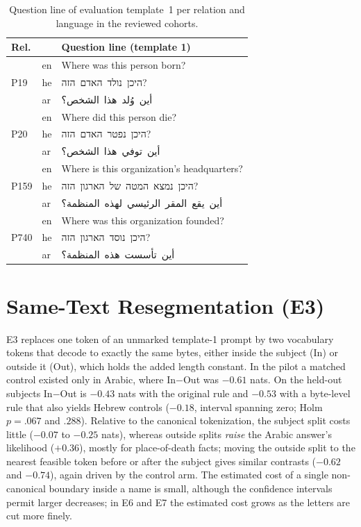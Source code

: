 \documentclass[11pt]{article}
\newcommand{\he}[1]{\mbox{\beginR\hebfont #1\endR}}
\newcommand{\ar}[1]{\mbox{\beginR\arabfont #1\endR}}
\begin{document}
\begin{table}[!ht]
\centering\small
\setlength{\tabcolsep}{4pt}
\renewcommand{\arraystretch}{1.15}
\begin{tabular}{@{}lll@{}}
\toprule
Rel. & & Question line (template 1)\\
\midrule
\multirow{3}{*}{P19} & en & Where was this person born?\\
 & he & \he{היכן נולד האדם הזה?}\\
 & ar & \ar{أين وُلد هذا الشخص؟}\\
\midrule
\multirow{3}{*}{P20} & en & Where did this person die?\\
 & he & \he{היכן נפטר האדם הזה?}\\
 & ar & \ar{أين توفي هذا الشخص؟}\\
\midrule
\multirow{3}{*}{P159} & en & Where is this organization's headquarters?\\
 & he & \he{היכן נמצא המטה של הארגון הזה?}\\
 & ar & \ar{أين يقع المقر الرئيسي لهذه المنظمة؟}\\
\midrule
\multirow{3}{*}{P740} & en & Where was this organization founded?\\
 & he & \he{היכן נוסד הארגון הזה?}\\
 & ar & \ar{أين تأسست هذه المنظمة؟}\\
\bottomrule
\end{tabular}
\caption{Question line of evaluation template~1 per relation and language in the
reviewed cohorts.}
\label{tab:templates}
\end{table}

\section{Same-Text Resegmentation (E3)}
\label{app:e3}
E3 replaces one token of an unmarked template-1 prompt by two vocabulary tokens
that decode to exactly the same bytes, either inside the subject (In) or outside
it (Out), which holds the added length constant. In the pilot a matched control
existed only in Arabic, where In$-$Out was $-0.61$ nats. On the held-out subjects
In$-$Out is $-0.43$ nats with the original rule and $-0.53$ with a byte-level rule
that also yields Hebrew controls ($-0.18$, interval spanning zero; Holm $p=.067$
and $.288$). Relative to the canonical tokenization, the subject split costs
little ($-0.07$ to $-0.25$ nats), whereas outside splits \emph{raise} the Arabic
answer's likelihood ($+0.36$), mostly for place-of-death facts; moving the
outside split to the nearest feasible token before or after the subject gives
similar contrasts ($-0.62$ and $-0.74$), again driven by the control arm. The
estimated cost of a single non-canonical boundary inside a name is small, although
the confidence intervals permit larger decreases; in E6 and E7 the estimated cost
grows as the letters are cut more finely.
\end{document}
